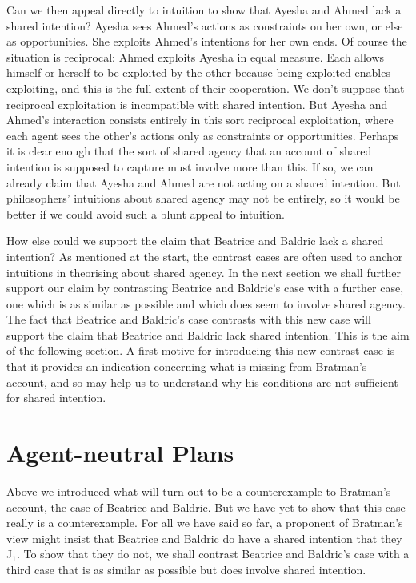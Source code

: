 \documentclass[12pt,\papersize]{extarticle}
\begin{document}
Can we then appeal directly to intuition to show that Ayesha and Ahmed lack a shared intention?
Ayesha sees Ahmed's actions as constraints on her own, or else as opportunities.
She exploits Ahmed's intentions for her own ends.
Of course the situation is reciprocal: Ahmed exploits Ayesha in equal measure.
Each allows himself or herself to be exploited by the other because being exploited enables exploiting,
and this is the full extent of their cooperation. 
We don't suppose that reciprocal exploitation is incompatible with shared intention. 
But Ayesha and Ahmed's interaction consists entirely in this sort reciprocal exploitation, where each agent sees the other's actions only as constraints or opportunities.
Perhaps it is clear enough that 
the sort of shared agency that an account of shared intention is supposed to capture must involve more than this. 
If so, we can already claim that Ayesha and Ahmed are not acting on a shared intention.
But philosophers' intuitions about shared agency may not be entirely, so it would be better if we could avoid such a blunt appeal to intuition.

How else could we support the claim that Beatrice and Baldric lack a shared intention? 
As mentioned at the start, 
the contrast cases are often used to anchor intuitions in theorising about shared agency.
In the next section we shall further support our claim by contrasting Beatrice and Baldric's case with a further case, one which is as similar as possible and which does seem to involve shared agency.
The fact that Beatrice and Baldric's case contrasts with this new case will support the claim that Beatrice and Baldric lack shared intention.
This is the aim of the following section.
A first motive for introducing this new contrast case is that it provides an indication concerning what is missing from Bratman's account, and so may help us to understand why his conditions are not sufficient for shared intention.



\section{Agent-neutral Plans}
\label{sec:distributed_plan}

Above we introduced what will turn out to be a counterexample to Bratman's account, the case of Beatrice and Baldric. 
But we have yet to show that this case really is a counterexample. 
For all we have said so far, a proponent of Bratman's view might insist that Beatrice and Baldric do have a shared intention that they J$_1$.
To show that they do not,
we shall contrast Beatrice and Baldric's case with a third case that is as similar as possible but does involve shared intention. 
\end{document}
